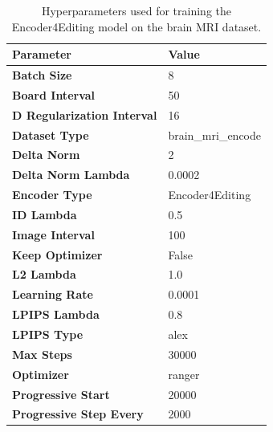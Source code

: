\begin{table}[ht]
\centering
\caption{Hyperparameters used for training the Encoder4Editing model on the brain MRI dataset.}
\label{tab:hyperparameters}
\begin{tabular}{l l}
\toprule
\textbf{Parameter}                & \textbf{Value}   \\           \hline
\textbf{Batch Size}                & 8      \\                    
\textbf{Board Interval}            & 50       \\                                       
\textbf{D Regularization Interval}& 16           \\                                  
\textbf{Dataset Type}              & brain\_mri\_encode  \\                                
\textbf{Delta Norm}                & 2        \\                                            
\textbf{Delta Norm Lambda}         & 0.0002      \\                                       
\textbf{Encoder Type}              & Encoder4Editing   \\                                
\textbf{ID Lambda}                 & 0.5       \\                                       
\textbf{Image Interval}            & 100   \\                                             
\textbf{Keep Optimizer}            & False   \\                                            
\textbf{L2 Lambda}                 & 1.0    \\                                            
\textbf{Learning Rate}             & 0.0001   \\                                          
\textbf{LPIPS Lambda}              & 0.8     \\                                            
\textbf{LPIPS Type}                & alex     \\                                         
\textbf{Max Steps}                 & 30000   \\                                             
\textbf{Optimizer}                 & ranger   \\                                           
\textbf{Progressive Start}         & 20000      \\                                      
\textbf{Progressive Step Every}    & 2000      \\                                        

\end{tabular}
\end{table}
